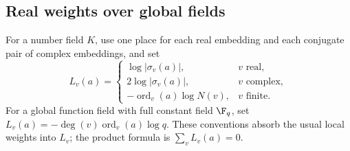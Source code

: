 \subsection{Real weights over global fields}
For a number field $K$, use one place for each real embedding and each
conjugate pair of complex embeddings, and set
\[
 L_v(a)=
 \begin{cases}
  \log|\sigma_v(a)|,&v\text{ real},\\
  2\log|\sigma_v(a)|,&v\text{ complex},\\
  -\operatorname{ord}_v(a)\log N(v),&v\text{ finite}.
 \end{cases}
\]
For a global function field with full constant field $\F_q$, set
$L_v(a)=-\deg(v)\operatorname{ord}_v(a)\log q$.
These conventions absorb the usual local weights into $L_v$; the product
formula is $\sum_vL_v(a)=0$.

